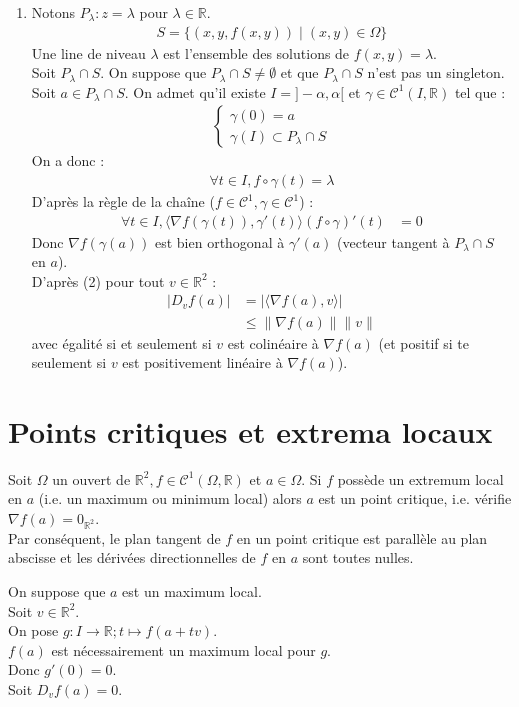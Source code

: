 \documentclass[../main.tex]{subfiles}
\begin{document}
\begin{enumerate}
    \item Notons $P_\lambda: z = \lambda$ pour $\lambda \in \mathbb{R}$. 
    \begin{align*}
        S = \{ (x, y, f(x, y)) \mid (x, y)\in \Omega \}
    \end{align*}
    Une line de niveau $\lambda$ est l'ensemble des solutions de $f(x, y) = \lambda$. \\
    Soit $P_\lambda\cap S$. On suppose que $P_\lambda\cap S \neq \emptyset$ et que $P_\lambda\cap S$ n'est pas un singleton. \\
    Soit $a\in P_\lambda\cap S$. On admet qu'il existe $I = ]-\alpha, \alpha[$ et $\gamma\in \mathcal{C}^1(I, \mathbb{R})$ tel que :
    \begin{align*}
        \begin{cases}
            \gamma(0) = a \\
            \gamma(I) \subset P_\lambda\cap S
        \end{cases}
    \end{align*}
    On a donc : 
    \begin{align*}
        \forall t\in I, f\circ \gamma(t) = \lambda
    \end{align*}
    D'après la règle de la chaîne ($f\in \mathcal{C}^1, \gamma\in \mathcal{C}^1$) : 
    \begin{align*}
        \forall t\in I, \langle \nabla f(\gamma(t)), \gamma'(t)\rangle (f\circ \gamma)'(t) &= 0
    \end{align*}
    Donc $\nabla f(\gamma(a))$ est bien orthogonal à $\gamma'(a)$ (vecteur tangent à $P_\lambda\cap S$ en $a$). \\
    D'après (2) pour tout $v\in \mathbb{R}^2$ : 
    \begin{align*}
        |D_v f(a)| &= |\langle \nabla f(a), v\rangle| \\
        &\leq \| \nabla f(a) \| \|v\|
    \end{align*}
    avec égalité si et seulement si $v$ est colinéaire à $\nabla f(a)$ (et positif si te seulement si $v$ est positivement linéaire à $\nabla f(a)$). 
\end{enumerate}

\section{Points critiques et extrema locaux}
\begin{tcolorbox}[title=Théorème 36.51, title filled=false, colframe=orange, colback=orange!10!white]
    Soit $\Omega$ un ouvert de $\mathbb{R}^2, f \in \mathcal{C}^1(\Omega, \mathbb{R})$ et $a \in \Omega$. Si $f$ possède un extremum local en $a$ (i.e. un maximum ou minimum local) alors $a$ est un point critique, i.e. vérifie $\nabla f(a)=0_{\mathbb{R}^2}$. \\
    Par conséquent, le plan tangent de $f$ en un point critique est parallèle au plan abscisse et les dérivées directionnelles de $f$ en $a$ sont toutes nulles.
\end{tcolorbox}

\noindent On suppose que $a$ est un maximum local. \\
Soit $v\in \mathbb{R}^2$. \\
On pose $g:I\to \mathbb{R}; t\mapsto f(a + tv)$. \\
$f(a)$ est nécessairement un maximum local pour $g$. \\
Donc $g'(0) = 0$. \\
Soit $D_v f(a) = 0$. 
\end{document}
